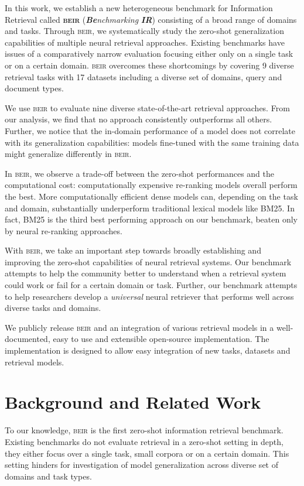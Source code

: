 \documentclass[11pt]{article}
\newcommand{\custo}[1]{\textsc{\normalsize #1}}
\newcommand{\beir}{\custo{beir}\xspace}
\begin{document}
In this work, we establish a new heterogeneous benchmark for Information Retrieval called \textbf{\beir} (\emph{\textbf{Be}nchmarking} \textbf{\emph{IR}}) consisting of a broad range of domains and tasks. Through \beir, we systematically study the zero-shot generalization capabilities of multiple neural retrieval approaches. 
Existing benchmarks \cite{guo2020multireqa, petroni2020kilt} have issues of a comparatively narrow evaluation focusing either only on a single task or on a certain domain. \beir overcomes these shortcomings by covering 9 diverse retrieval tasks with 17 datasets including a diverse set of domains, query and document types.

We use \beir to evaluate nine diverse state-of-the-art retrieval approaches. From our analysis, we find that no approach consistently outperforms all others. Further, we notice that the in-domain performance of a model does not correlate with its generalization capabilities: models fine-tuned with the same training data might generalize differently in \beir.

In \beir, we observe a trade-off between the zero-shot performances and the computational cost: computationally expensive re-ranking models overall perform the best. More computationally efficient dense models can, depending on the task and domain, substantially underperform traditional lexical models like BM25. In fact, BM25 is the third best performing approach on our benchmark, beaten only by neural re-ranking approaches.

With \beir, we take an important step towards broadly establishing and improving the zero-shot capabilities of neural retrieval systems. Our benchmark attempts to help the community better to understand when a retrieval system could work or fail for a certain domain or task. Further, our benchmark attempts to help researchers develop a \textit{universal} neural retriever that performs well across diverse tasks and domains. 

We publicly release \beir and an integration of various retrieval models in a well-documented, easy to use and extensible open-source implementation. The implementation is designed to allow easy integration of new tasks, datasets and retrieval models. 

\section{Background and Related Work}
To our knowledge, \beir is the first zero-shot information retrieval benchmark. Existing benchmarks do not evaluate retrieval in a zero-shot setting in depth, they either focus over a single task, small corpora or on a certain domain. This setting hinders for investigation of model generalization across diverse set of domains and task types. 
\end{document}
